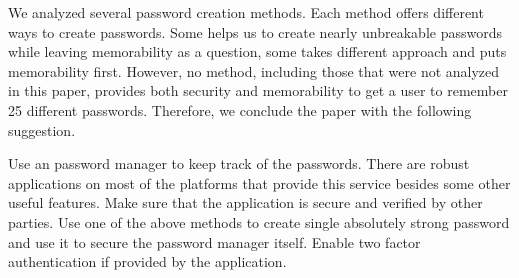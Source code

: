 \documentclass[acmsmall,nonacm]{acmart}
\begin{document}
We analyzed several password creation methods. Each method offers different ways to create passwords. Some helps us to create nearly unbreakable passwords while leaving memorability as a question, some takes different approach and puts memorability first. However, no method, including those that were not analyzed in this paper, provides both security and memorability to get a user to remember 25 different passwords. Therefore, we conclude the paper with the following suggestion.

Use an password manager to keep track of the passwords. There are robust applications on most of the platforms that provide this service besides some other useful features. Make sure that the application is secure and verified by other parties. Use one of the above methods to create single absolutely strong password and use it to secure the password manager itself. Enable two factor authentication if provided by the application.




\appendix
\end{document}
